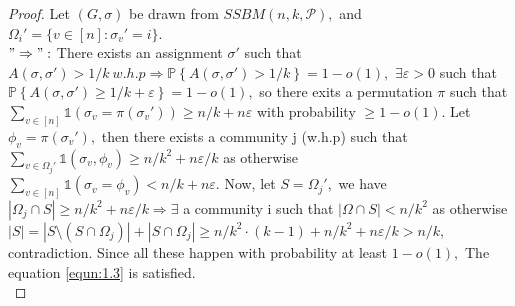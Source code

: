 \begin{proof}
    Let $(G, \sigma)$ be drawn from $SSBM(n, k, \mathcal{P}),$ and $\Omega_i' = \{ v\in [n] : \sigma_v' = i \}.$ \\
    $"\Rightarrow":$ There exists an assignment $\sigma'$ such that $A(\sigma, \sigma')>1/k~w.h.p \Rightarrow \mathbb{P}\left\{A(\sigma, \sigma')>1/k\right\}=1-o(1),$ $\exists\varepsilon>0$ such that $\mathbb{P}\left\{A(\sigma, \sigma')\geq1/k+\varepsilon\right\}=1-o(1),$ so there exits a permutation $\pi$ such that $\sum_{v\in[n]}\mathbb{1}(\sigma_v=\pi(\sigma_v'))\geq n/k + n\varepsilon$ with probability $\geq 1-o(1)$. Let $\phi_v=\pi(\sigma_v'),$ then there exists a community j (w.h.p) such that $\sum_{v\in \Omega_j'}\mathbb{1}(\sigma_v, \phi_v)\geq n/k^2 +n\varepsilon/k$ as otherwise $\sum_{v\in[n]}\mathbb{1}(\sigma_v=\phi_v)< n/k + n\varepsilon.$ Now, let $S=\Omega_j',$ we have $|\Omega_j\cap S|\geq n/k^2 +n\varepsilon/k \Rightarrow \exists$ a community i such that $|\Omega\cap S|<n/k^2$ as otherwise $|S|=|S\setminus(S\cap\Omega_j)|+|S\cap\Omega_j|\geq n/k^2\cdot(k-1)+n/k^2 +n\varepsilon/k>n/k,$ contradiction. Since all these happen with probability at least $1-o(1),$ The equation \ref{equn:1.3} is satisfied.\\
    

\end{proof}
